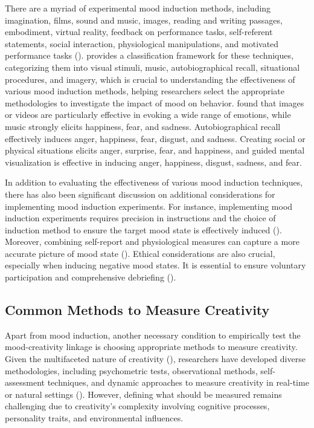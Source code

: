 \documentclass[../MA_Thesis.tex]{subfiles}
\begin{document}
There are a myriad of experimental mood induction methods, including imagination, films, sound and music, images, reading and writing passages, embodiment, virtual reality, feedback on performance tasks, self-referent statements, social interaction, physiological manipulations, and motivated performance tasks (\cite{lischetzke_mood_2022, maryam_fakhrhosseini_affectemotion_2017}). \textcite{siedlecka_experimental_2019} provides a classification framework for these techniques, categorizing them into visual stimuli, music, autobiographical recall, situational procedures, and imagery, which is crucial to understanding the effectiveness of various mood induction methods, helping researchers select the appropriate methodologies to investigate the impact of mood on behavior. \textcite{siedlecka_experimental_2019} found that images or videos are particularly effective in evoking a wide range of emotions, while music strongly elicits happiness, fear, and sadness. Autobiographical recall effectively induces anger, happiness, fear, disgust, and sadness. Creating social or physical situations elicits anger, surprise, fear, and happiness, and guided mental visualization is effective in inducing anger, happiness, disgust, sadness, and fear.

In addition to evaluating the effectiveness of various mood induction techniques, there has also been significant discussion on additional considerations for implementing mood induction experiments. For instance, implementing mood induction experiments requires precision in instructions and the choice of induction method to ensure the target mood state is effectively induced (\cite{maryam_fakhrhosseini_affectemotion_2017, siedlecka_experimental_2019}). Moreover, combining self-report and physiological measures can capture a more accurate picture of mood state (\cite{quigley_inducing_2014, siedlecka_experimental_2019}). Ethical considerations are also crucial, especially when inducing negative mood states. It is essential to ensure voluntary participation and comprehensive debriefing (\cite{maryam_fakhrhosseini_affectemotion_2017, quigley_inducing_2014, siedlecka_experimental_2019}).

\subsection*{Common Methods to Measure Creativity}
Apart from mood induction, another necessary condition to empirically test the mood-creativity linkage is choosing appropriate methods to measure creativity. Given the multifaceted nature of creativity (\cite{de_alencar_theory_2021}), researchers have developed diverse methodologies, including psychometric tests, observational methods, self-assessment techniques, and dynamic approaches to measure creativity in real-time or natural settings (\cite{kaufman_cambridge_2010}). However, defining what should be measured remains challenging due to creativity's complexity involving cognitive processes, personality traits, and environmental influences.
\end{document}
